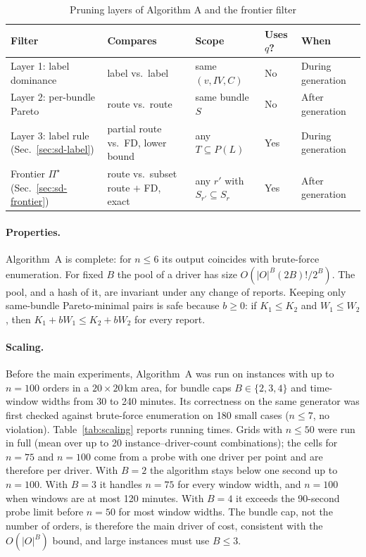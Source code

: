 \begin{table}[t]
\centering
\caption{Pruning layers of Algorithm A and the frontier filter}
\label{tab:layers}
\small
\begin{tabular}{P{3.1cm}P{3.0cm}P{3.2cm}P{1.5cm}P{2.9cm}}
\toprule
Filter & Compares & Scope & Uses $q$? & When\\
\midrule
Layer 1: label dominance & label vs.\ label & same $(v,IV,C)$ & No & During generation\\
Layer 2: per-bundle Pareto & route vs.\ route & same bundle $S$ & No & After generation\\
Layer 3: label rule (Sec.~\ref{sec:sd-label}) & partial route vs.\ FD, lower bound & any $T\subseteq P(L)$ & Yes & During generation\\
Frontier $\Pi^\star$ (Sec.~\ref{sec:sd-frontier}) & route vs.\ subset route $+$ FD, exact & any $r'$ with $S_{r'}\subseteq S_r$ & Yes & After generation\\
\bottomrule
\end{tabular}
\end{table}

\paragraph{Properties.} Algorithm~A is complete: for $n\le 6$ its output
coincides with brute-force enumeration. For fixed $B$ the pool of a driver
has size $O(|O|^B(2B)!/2^B)$. The pool, and a hash of it, are invariant
under any change of reports. Keeping only same-bundle Pareto-minimal pairs
is safe because $b\ge 0$: if $K_1\le K_2$ and $W_1\le W_2$, then
$K_1+bW_1\le K_2+bW_2$ for every report.

\paragraph{Scaling.} Before the main experiments, Algorithm~A was run on
instances with up to $n=100$ orders in a $20\times20$\,km area, for bundle caps
$B\in\{2,3,4\}$ and time-window widths from 30 to 240 minutes. Its
correctness on the same generator was first checked against brute-force
enumeration on 180 small cases ($n\le 7$, no violation).
Table~\ref{tab:scaling} reports running times. Grids with $n\le 50$ were
run in full (mean over up to 20 instance--driver-count combinations); the
cells for $n=75$ and $n=100$ come from a probe with one driver per point and
are therefore per driver. With $B=2$ the algorithm stays below one second up
to $n=100$. With $B=3$ it handles $n=75$ for every window width, and $n=100$
when windows are at most 120 minutes. With $B=4$ it exceeds the 90-second
probe limit before $n=50$ for most window widths. The bundle cap, not the
number of orders, is therefore the main driver of cost, consistent with the
$O(|O|^B)$ bound, and large instances must use $B\le 3$.

